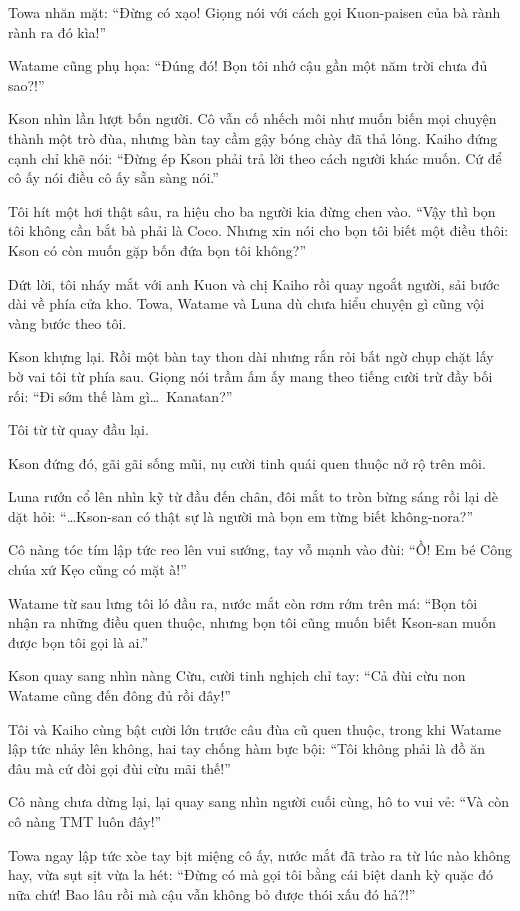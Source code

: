 \documentclass[../main.tex]{subfiles}
\begin{document}
Towa nhăn mặt: ``Đừng có xạo! Giọng nói với cách gọi Kuon-paisen của bà rành rành ra đó kìa!''

Watame cũng phụ họa: ``Đúng đó! Bọn tôi nhớ cậu gần một năm trời chưa đủ sao?!''

Kson nhìn lần lượt bốn người. Cô vẫn cố nhếch môi như muốn biến mọi chuyện thành một trò đùa, nhưng bàn tay cầm gậy bóng chày đã thả lỏng. Kaiho đứng cạnh chỉ khẽ nói: ``Đừng ép Kson phải trả lời theo cách người khác muốn. Cứ để cô ấy nói điều cô ấy sẵn sàng nói.''

Tôi hít một hơi thật sâu, ra hiệu cho ba người kia đừng chen vào. ``Vậy thì bọn tôi không cần bắt bà phải là Coco. Nhưng xin nói cho bọn tôi biết một điều thôi: Kson có còn muốn gặp bốn đứa bọn tôi không?''

Dứt lời, tôi nháy mắt với anh Kuon và chị Kaiho rồi quay ngoắt người, sải bước dài về phía cửa kho. Towa, Watame và Luna dù chưa hiểu chuyện gì cũng vội vàng bước theo tôi.

Kson khựng lại. Rồi một bàn tay thon dài nhưng rắn rỏi bất ngờ chụp chặt lấy bờ vai tôi từ phía sau. Giọng nói trầm ấm ấy mang theo tiếng cười trừ đầy bối rối: ``Đi sớm thế làm gì\dots\ Kanatan?''

Tôi từ từ quay đầu lại.

Kson đứng đó, gãi gãi sống mũi, nụ cười tinh quái quen thuộc nở rộ trên môi.

Luna rướn cổ lên nhìn kỹ từ đầu đến chân, đôi mắt to tròn bừng sáng rồi lại dè dặt hỏi: ``\dots Kson-san có thật sự là người mà bọn em từng biết không-nora?''

Cô nàng tóc tím lập tức reo lên vui sướng, tay vỗ mạnh vào đùi: ``Ồ! Em bé Công chúa xứ Kẹo cũng có mặt à!''

Watame từ sau lưng tôi ló đầu ra, nước mắt còn rơm rớm trên má: ``Bọn tôi nhận ra những điều quen thuộc, nhưng bọn tôi cũng muốn biết Kson-san muốn được bọn tôi gọi là ai.''

Kson quay sang nhìn nàng Cừu, cười tinh nghịch chỉ tay: ``Cả đùi cừu non Watame cũng đến đông đủ rồi đây!''

Tôi và Kaiho cùng bật cười lớn trước câu đùa cũ quen thuộc, trong khi Watame lập tức nhảy lên không, hai tay chống hàm bực bội: ``Tôi không phải là đồ ăn đâu mà cứ đòi gọi đùi cừu mãi thế!''

Cô nàng chưa dừng lại, lại quay sang nhìn người cuối cùng, hô to vui vẻ: ``Và còn cô nàng TMT luôn đây!''

Towa ngay lập tức xòe tay bịt miệng cô ấy, nước mắt đã trào ra từ lúc nào không hay, vừa sụt sịt vừa la hét: ``Đừng có mà gọi tôi bằng cái biệt danh kỳ quặc đó nữa chứ! Bao lâu rồi mà cậu vẫn không bỏ được thói xấu đó hả?!''
\end{document}
